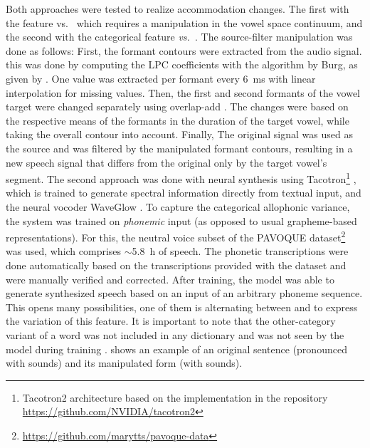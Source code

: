 Both approaches were tested to realize accommodation changes.
The first with the feature \textipa{[E:]} vs.\ \textipa{[e:]} which requires a manipulation in the vowel space continuum, and the second with the categorical feature \emph{\textipa{[\c{c}]} vs.\ \textipa{[k]}}.
The source-filter manipulation was done as follows:
First, the formant contours were extracted from the audio signal.
this was done by computing the LPC coefficients with the algorithm by Burg, as given by \citet{Press1989numerical}.
One value was extracted per formant every \SI{6}{\milli\second} with linear interpolation for missing values.
Then, the first and second formants of the vowel target were changed separately using overlap-add \citep{Hamon1989diphone}.
The changes were based on the respective means of the formants in the duration of the target vowel, while taking the overall contour into account.
Finally, The original signal was used as the source and was filtered by the manipulated formant contours, resulting in a new speech signal that differs from the original only by the target vowel's segment.
The second approach was done with neural synthesis using Tacotron\footnote{Tacotron2 architecture based on the implementation in the repository \url{https://github.com/NVIDIA/tacotron2}} \citep{Shen2018natural}, which is trained to generate spectral information directly from textual input, and the neural vocoder WaveGlow \citep{Prenger2019WaveGlow}.
To capture the categorical allophonic variance, the system was trained on \emph{phonemic} input (as opposed to usual grapheme-based representations).
For this, the neutral voice subset of the PAVOQUE dataset\footnote{\url{https://github.com/marytts/pavoque-data}} \citep{Steiner2013pavoque} was used, which comprises $\sim$\SI{5.8}{\hour} of speech.
The phonetic transcriptions were done automatically based on the transcriptions provided with the dataset and were manually verified and corrected.
After training, the model was able to generate synthesized speech based on an input of an arbitrary phoneme sequence.
This opens many possibilities, one of them is alternating between \textipa{[\c{c}]} and \textipa{[k]} to express the variation of this feature.
It is important to note that the other-category variant of a word was not included in any dictionary and was not seen by the model during training \citep[and see][for more details]{Raveh2021ICASSP}.
 shows an example of an original sentence (pronounced with \textipa{[\c{c}]} sounds) and its manipulated form (with \textipa{[k]} sounds).
